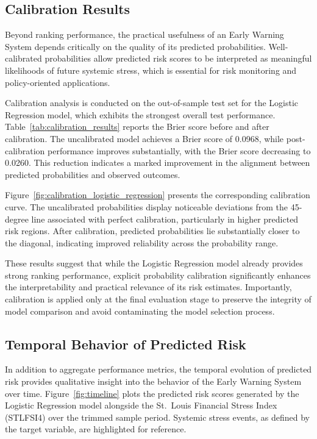 \documentclass[11pt,a4paper]{article}
\begin{document}
\subsection{Calibration Results}
\label{subsec:calibration_results}

Beyond ranking performance, the practical usefulness of an Early Warning System depends critically on the quality of its predicted probabilities. Well-calibrated probabilities allow predicted risk scores to be interpreted as meaningful likelihoods of future systemic stress, which is essential for risk monitoring and policy-oriented applications.

Calibration analysis is conducted on the out-of-sample test set for the Logistic Regression model, which exhibits the strongest overall test performance. Table~\ref{tab:calibration_results} reports the Brier score before and after calibration. The uncalibrated model achieves a Brier score of 0.0968, while post-calibration performance improves substantially, with the Brier score decreasing to 0.0260. This reduction indicates a marked improvement in the alignment between predicted probabilities and observed outcomes.

Figure~\ref{fig:calibration_logistic_regression} presents the corresponding calibration curve. The uncalibrated probabilities display noticeable deviations from the 45-degree line associated with perfect calibration, particularly in higher predicted risk regions. After calibration, predicted probabilities lie substantially closer to the diagonal, indicating improved reliability across the probability range.

These results suggest that while the Logistic Regression model already provides strong ranking performance, explicit probability calibration significantly enhances the interpretability and practical relevance of its risk estimates. Importantly, calibration is applied only at the final evaluation stage to preserve the integrity of model comparison and avoid contaminating the model selection process.

\subsection{Temporal Behavior of Predicted Risk}
\label{subsec:temporal_behavior}

In addition to aggregate performance metrics, the temporal evolution of predicted risk provides qualitative insight into the behavior of the Early Warning System over time. Figure~\ref{fig:timeline} plots the predicted risk scores generated by the Logistic Regression model alongside the St.\ Louis Financial Stress Index (STLFSI4) over the trimmed sample period. Systemic stress events, as defined by the target variable, are highlighted for reference.
\end{document}
